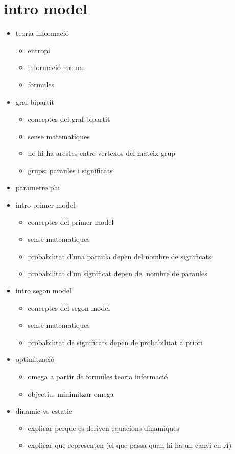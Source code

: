 \section{intro model}
\begin{itemize}
\item teoria informació
  \begin{itemize}
  \item entropi
  \item informació mutua
  \item formules
  \end{itemize}
\item graf bipartit
  \begin{itemize}
  \item conceptes del graf bipartit
  \item sense matematiques
  \item no hi ha arestes entre vertexos del mateix grup
  \item grups: paraules i significats
  \end{itemize}
\item parametre phi
\item intro primer model
  \begin{itemize}
  \item conceptes del primer model
  \item sense matematiques
  \item probabilitat d'una paraula depen del nombre de significats
  \item probabilitat d'un significat depen del nombre de paraules
  \end{itemize}
\item intro segon model
  \begin{itemize}
  \item conceptes del segon model
  \item sense matematiques
  \item probabilitat de significats depen de probabilitat a priori
  \end{itemize}
\item optimització
  \begin{itemize}
  \item omega a partir de formules teoria informació
  \item objectiu: minimitzar omega
  \end{itemize}
\item dinamic vs estatic
  \begin{itemize}
  \item explicar perque es deriven equacions dinamiques
  \item explicar que representen (el que passa quan hi ha un canvi en $A$)
  \end{itemize}
\end{itemize}
